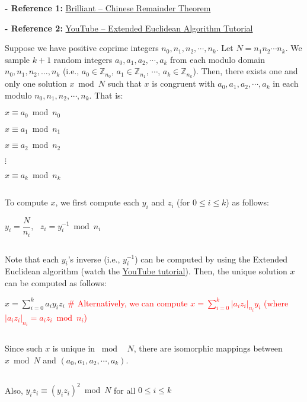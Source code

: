 \textbf{- Reference 1:} 
\href{https://brilliant.org/wiki/chinese-remainder-theorem/}{Brilliant -- Chinese Remainder Theorem}~\cite{crt}

\noindent \textbf{- Reference 2:} 
\href{https://www.youtube.com/watch?v=fz1vxq5ts5I}{YouTube -- Extended Euclidean Algorithm Tutorial}



\begin{tcolorbox}[title={\textbf{\tboxtheorem{\ref*{sec:chinese-remainder}.1} Chinese Remainder Theorem}}]

Suppose we have positive coprime integers $n_0, n_1, n_2, \cdots, n_k$. Let $N = n_1 n_2 \cdots n_k$. We sample $k + 1$ random integers $a_0, a_1, a_2, \cdots, a_k$ from each modulo domain $n_0, n_1, n_2, \dots, n_k$ (i.e., $a_0 \in \mathbb{Z}_{n_0}$, $a_1 \in \mathbb{Z}_{n_1}$, $\cdots$, $a_k \in \mathbb{Z}_{n_k}$). Then, there exists one and only one solution $x \bmod N$ such that $x$ is congruent with $a_0, a_1, a_2, \cdots, a_k$ in each modulo $n_0, n_1, n_2, \cdots, n_k$. That is: 

\text{ } $x \equiv a_0 \bmod n_0$

\text{ } $x \equiv a_1 \bmod n_1$

\text{ } $x \equiv a_2 \bmod n_2$

\text{ } \text{ } $\vdots$

\text{ } $x \equiv a_k \bmod n_k$

$ $

To compute $x$, we first compute each $y_i$ and $z_i$ (for $0 \leq i \leq k$) as follows:

$y_i = \dfrac{N}{n_i}, \text{ } z_i = y_i^{-1} \bmod n_i$

$ $

Note that each $y_i$'s inverse (i.e., $y_i^{-1}$) can be computed by using the Extended Euclidean algorithm (watch the \href{https://www.youtube.com/watch?v=fz1vxq5ts5I}{YouTube tutorial}). Then, the unique solution $x$ can be computed as follows:

$x = \sum\limits_{i=0}^k a_i y_i z_i $ \textcolor{red}{ \# Alternatively, we can compute $ x = \sum\limits_{i=0}^k |a_i z_i|_{n_i} y_i$ (where $|a_i z_i|_{n_i} = a_i z_i \bmod n_i$)}

$ $

Since such $x$ is unique in $\bmod \text{ } N$, there are isomorphic mappings between $x \bmod N$ and $(a_0, a_1, a_2, \cdots, a_k)$.

$ $

Also, $y_iz_i \equiv (y_iz_i)^2 \bmod N$  \text{ } for all $0 \leq i \leq k$ 
\end{tcolorbox}

